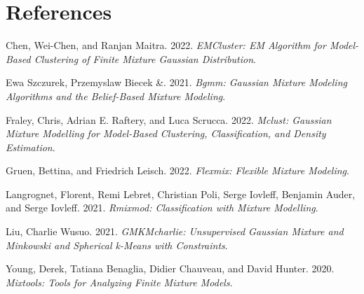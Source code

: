 \hypertarget{references}{%
\section*{References}\label{references}}

\hypertarget{refs}{}
\begin{CSLReferences}{1}{0}
\leavevmode{}%
Chen, Wei-Chen, and Ranjan Maitra. 2022. \emph{EMCluster: EM Algorithm for Model-Based Clustering of Finite Mixture Gaussian Distribution}.

\leavevmode{}%
Ewa Szczurek, Przemyslaw Biecek \&. 2021. \emph{Bgmm: Gaussian Mixture Modeling Algorithms and the Belief-Based Mixture Modeling}.

\leavevmode{}%
Fraley, Chris, Adrian E. Raftery, and Luca Scrucca. 2022. \emph{Mclust: Gaussian Mixture Modelling for Model-Based Clustering, Classification, and Density Estimation}.

\leavevmode{}%
Gruen, Bettina, and Friedrich Leisch. 2022. \emph{Flexmix: Flexible Mixture Modeling}.

\leavevmode{}%
Langrognet, Florent, Remi Lebret, Christian Poli, Serge Iovleff, Benjamin Auder, and Serge Iovleff. 2021. \emph{Rmixmod: Classification with Mixture Modelling}.

\leavevmode{}%
Liu, Charlie Wusuo. 2021. \emph{GMKMcharlie: Unsupervised Gaussian Mixture and Minkowski and Spherical k-Means with Constraints}.

\leavevmode{}%
Young, Derek, Tatiana Benaglia, Didier Chauveau, and David Hunter. 2020. \emph{Mixtools: Tools for Analyzing Finite Mixture Models}.

\end{CSLReferences}



\address{%
Bastien Chassagnol\\
Laboratoire de Probabilités, Statistiques et Modélisation (LPSM), UMR CNRS 8001\\%
4 Place Jussieu Sorbonne Université\\ 75005, Paris, France\\
%
%
\textit{ORCiD: \href{https://orcid.org/0000-0002-8955-2391}{0000-0002-8955-2391}}\\%
\href{mailto:bastien_chassagnol@laposte.net}{\nolinkurl{bastien\_chassagnol@laposte.net}}%
}

